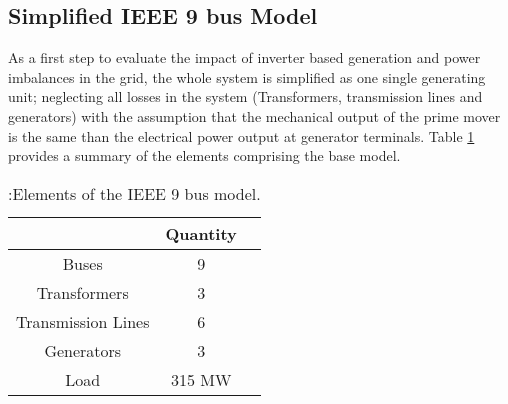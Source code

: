 \subsection{Simplified IEEE 9 bus Model}
\label{ssec:simpleieee}
As a first step to evaluate the impact of inverter based generation and power imbalances in the grid, the whole system is simplified as one single generating unit; neglecting all losses in the system (Transformers, transmission lines and generators) with the assumption that the mechanical output of the prime mover is the same than the electrical power output at generator terminals. Table \ref{tb:gridelements} provides a summary of the elements comprising the base model.\\

\begin{table}[h]
	\caption{\label{tb:gridelements}:Elements of the IEEE 9 bus model.}
	\centering
	\begin{tabular}{ccc}
		\toprule
		\textbf{}	& \textbf{Quantity}\\
		\midrule
		Buses		& 9			\\
		Transformers		& 3			\\
 		Transmission Lines			& 6 \\
		Generators			& 3 \\
 		Load			&  315 MW  \\
		\bottomrule
	\end{tabular}
\end{table}





